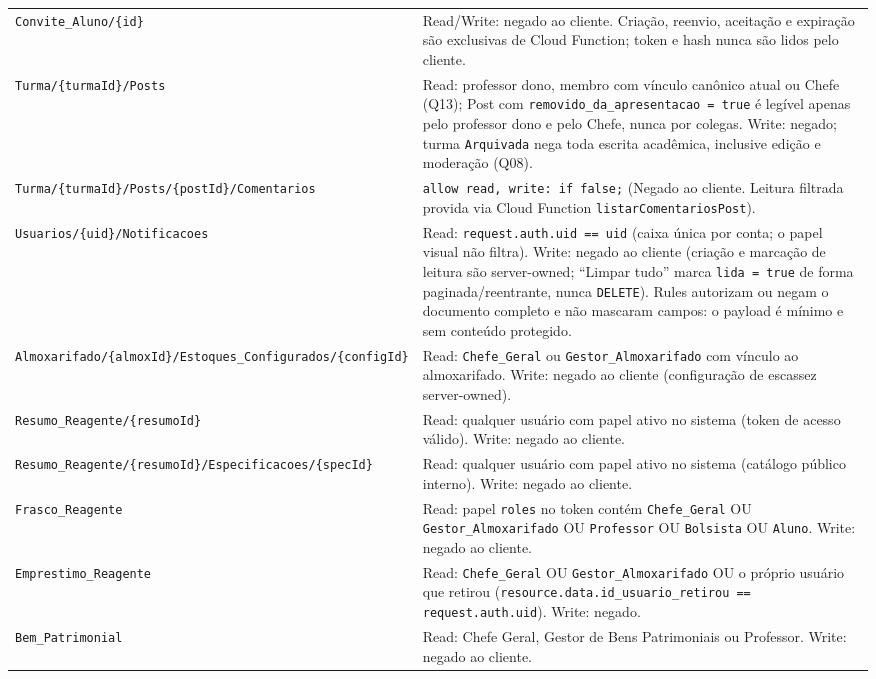 \begin{longtable}{>{\raggedright\arraybackslash}p{} >{\raggedright\arraybackslash}p{}}
\nolinkurl{Convite\_Aluno/\{id\}} & Read/Write: negado ao cliente. Criação, reenvio, aceitação e expiração são exclusivas de Cloud Function; token e hash nunca são lidos pelo cliente.\\
\nolinkurl{Turma/\{turmaId\}/Posts} & Read: professor dono, membro com vínculo canônico atual ou Chefe (Q13); Post com \texttt{removido\_da\_apresentacao = true} é legível apenas pelo professor dono e pelo Chefe, nunca por colegas. Write: negado; turma \texttt{Arquivada} nega toda escrita acadêmica, inclusive edição e moderação (Q08).\\
\nolinkurl{Turma/\{turmaId\}/Posts/\{postId\}/Comentarios} & \texttt{allow read, write: if false;} (Negado ao cliente. Leitura filtrada provida via Cloud Function \texttt{listarComentariosPost}).\\
\nolinkurl{Usuarios/\{uid\}/Notificacoes} & Read: \texttt{request.auth.uid == uid} (caixa única por conta; o papel visual não filtra). Write: negado ao cliente (criação e marcação de leitura são server-owned; ``Limpar tudo'' marca \texttt{lida = true} de forma paginada/reentrante, nunca \texttt{DELETE}). Rules autorizam ou negam o documento completo e não mascaram campos: o payload é mínimo e sem conteúdo protegido.\\
\nolinkurl{Almoxarifado/\{almoxId\}/Estoques\_Configurados/\{configId\}} & Read: \texttt{Chefe\_Geral} ou \texttt{Gestor\_Almoxarifado} com vínculo ao almoxarifado. Write: negado ao cliente (configuração de escassez server-owned).\\
\nolinkurl{Resumo\_Reagente/\{resumoId\}} & Read: qualquer usuário com papel ativo no sistema (token de acesso válido). Write: negado ao cliente.\\
\nolinkurl{Resumo\_Reagente/\{resumoId\}/Especificacoes/\{specId\}} & Read: qualquer usuário com papel ativo no sistema (catálogo público interno). Write: negado ao cliente.\\
\texttt{Frasco\_Reagente} & Read: papel \texttt{roles} no token contém \texttt{Chefe\_Geral} OU \texttt{Gestor\_Almoxarifado} OU \texttt{Professor} OU \texttt{Bolsista} OU \texttt{Aluno}. Write: negado ao cliente.\\
\texttt{Emprestimo\_Reagente} & Read: \texttt{Chefe\_Geral} OU \texttt{Gestor\_Almoxarifado} OU o próprio usuário que retirou (\texttt{resource.data.id\_usuario\_retirou == request.auth.uid}). Write: negado.\\
\texttt{Bem\_Patrimonial} & Read: Chefe Geral, Gestor de Bens Patrimoniais ou Professor. Write: negado ao cliente.\\

\end{longtable}
